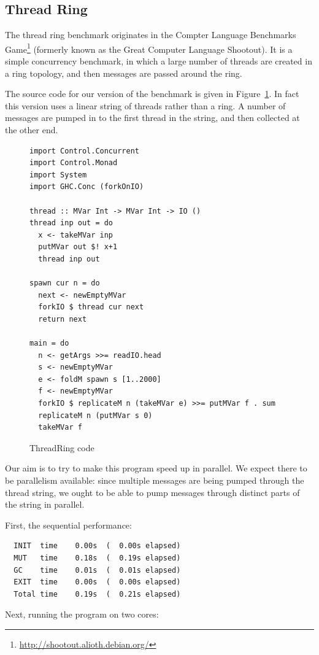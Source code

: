 \subsection{Thread Ring}

The thread ring benchmark originates in the Compter Language
Benchmarks Game\footnote{\url{http://shootout.alioth.debian.org/}} (formerly known as the Great Computer
Language Shootout).  It is a simple concurrency benchmark, in which a
large number of threads are created in a ring topology, and then
messages are passed around the ring.

The source code for our version of the benchmark is given in
Figure~\ref{f:threadring-code}.  In fact this version uses a linear
string of threads rather than a ring.  A number of messages are pumped
in to the first thread in the string, and then collected at the other
end.

\begin{figure}
\begin{lstlisting}
import Control.Concurrent
import Control.Monad
import System
import GHC.Conc (forkOnIO)

thread :: MVar Int -> MVar Int -> IO ()
thread inp out = do 
  x <- takeMVar inp
  putMVar out $! x+1
  thread inp out

spawn cur n = do 
  next <- newEmptyMVar
  forkIO $ thread cur next
  return next

main = do 
  n <- getArgs >>= readIO.head
  s <- newEmptyMVar
  e <- foldM spawn s [1..2000]
  f <- newEmptyMVar
  forkIO $ replicateM n (takeMVar e) >>= putMVar f . sum
  replicateM n (putMVar s 0)
  takeMVar f
\end{lstlisting}
\caption{ThreadRing code}
\label{f:threadring-code}
\end{figure}

Our aim is to try to make this program speed up in parallel.  We
expect there to be parallelism available: since multiple messages are
being pumped through the thread string, we ought to be able to pump
messages through distinct parts of the string in parallel.

First, the sequential performance:

\begin{verbatim}
  INIT  time    0.00s  (  0.00s elapsed)
  MUT   time    0.18s  (  0.19s elapsed)
  GC    time    0.01s  (  0.01s elapsed)
  EXIT  time    0.00s  (  0.00s elapsed)
  Total time    0.19s  (  0.21s elapsed)
\end{verbatim}

Next, running the program on two cores:

